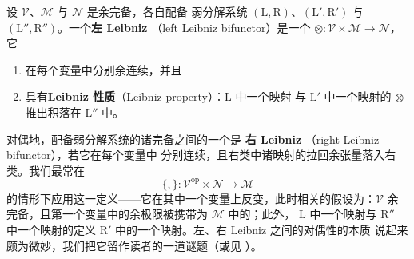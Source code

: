 \begin{definition}\label{def:left-leibniz-bifunctor}
设 $\mathcal{V}$、$\mathcal{M}$ 与 $\mathcal{N}$ 是余完备\trCategory，各自配备
弱分解系统 $(\mathrm{L},\mathrm{R})$、$(\mathrm{L}',\mathrm{R}')$ 与
$(\mathrm{L}'',\mathrm{R}'')$。一个\textbf{左 Leibniz \trBifunctor}（left
Leibniz bifunctor）是一个\trBifunctor{}
$\otimes\colon\mathcal{V}\times\mathcal{M}\to\mathcal{N}$，它
\begin{enumerate}[label=(\roman*)]
\item 在每个变量中分别余连续，并且
\item 具有\textbf{Leibniz 性质}（Leibniz property）：$\mathrm{L}$ 中一个映射
  与 $\mathrm{L}'$ 中一个映射的 $\otimes$-推出积落在 $\mathrm{L}''$ 中。
\end{enumerate}
\end{definition}

对偶地，配备弱分解系统的诸完备\trCategory{}之间的一个\trBifunctor{}是
\textbf{右 Leibniz \trBifunctor}（right Leibniz bifunctor），若它在每个变量中
分别连续，且右类中诸映射的拉回余张量落入右类。我们最常在\trBifunctor
\[ \{,\}\colon\mathcal{V}^{\mathrm{op}}\times\mathcal{N}\to\mathcal{M} \]
的情形下应用这一定义——它在其中一个变量上反变，此时相关的假设为：$\mathcal{V}$
余完备，且第一个变量中的余极限被携带为 $\mathcal{M}$ 中的\trLimit；此外，
$\mathrm{L}$ 中一个映射与 $\mathrm{R}''$ 中一个映射的\trLeibnizCotensor{}定义
$\mathrm{R}'$ 中的一个映射。左、右 Leibniz \trBifunctor{}之间的对偶性的本质
说起来颇为微妙，我们把它留作读者的一道谜题（或见 \cite{bib26}）。

